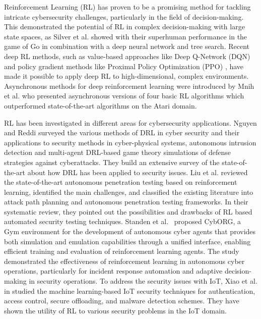\documentclass[pdflatex,sn-mathphys-num]{sn-jnl}%
\theoremstyle{thmstyleone}%
\theoremstyle{thmstyletwo}%
\theoremstyle{thmstylethree}%
\begin{document}
	Reinforcement Learning (RL) has proven to be a promising method for tackling intricate cybersecurity challenges, particularly in the field of decision-making. This demonstrated the potential of RL in complex decision-making with large state spaces, as Silver et al. \cite{silver2016mastering} showed with their superhuman performance in the game of Go in combination with a deep neural network and tree search. Recent deep RL methods, such as value-based approaches like Deep Q-Network (DQN) \cite{mnih2015human} and policy gradient methods like Proximal Policy Optimization (PPO) \cite{schulman2017ppo}, have made it possible to apply deep RL to high-dimensional, complex environments. Asynchronous methods for deep reinforcement learning were introduced by Mnih et al. \cite{mnih2016asynchronous} who presented asynchronous versions of four basic RL algorithms which outperformed state-of-the-art algorithms on the Atari domain.
	
	RL has been investigated in different areas for cybersecurity applications. Nguyen and Reddi \cite{nguyen2021deep} surveyed the various methods of DRL in cyber security and their applications to security methods in cyber-physical systems, autonomous intrusion detection and multi-agent DRL-based game theory simulations of defense strategies against cyberattacks. They build an extensive survey of the state-of-the-art about how DRL has been applied to security issues. Liu et al. \cite{liu2025autonomous} reviewed the state-of-the-art autonomous penetration testing based on reinforcement learning, identified the main challenges, and classified the existing literature into attack path planning and autonomous penetration testing frameworks. In their systematic review, they pointed out the possibilities and drawbacks of RL based automated security testing techniques. 	Standen et al.~\cite{standen2021cyborg} proposed CybORG, a Gym environment for the development of autonomous cyber agents that provides both simulation and emulation capabilities through a unified interface, enabling efficient training and evaluation of reinforcement learning agents. The study demonstrated the effectiveness of reinforcement learning in autonomous cyber operations, particularly for incident response automation and adaptive decision-making in security operations. To address the security issues with IoT, Xiao et al. in \cite{xiao2018iot} studied the machine learning-based IoT security techniques for authentication, access control, secure offloading, and malware detection schemes. They have shown the utility of RL to various security problems in the IoT domain.
	
\end{document}
